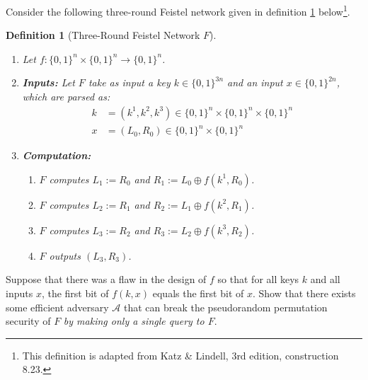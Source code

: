 \documentclass[11pt]{article}
\newcommand{\A}{\mathcal{A}}
\newtheorem{definition}[theorem]{Definition}
\numberwithin{equation}{section}
\begin{document}
Consider the following three-round Feistel network given in definition \ref{def:feistel_network} below\footnote{This definition is adapted from Katz \& Lindell, 3rd edition, construction 8.23.}.
\begin{definition}[Three-Round Feistel Network $F$]\label{def:feistel_network}
$ $
\begin{enumerate}
    \item Let $f: \{0,1\}^n \times \{0,1\}^{n}\to \{0,1\}^n$.
    \item \textbf{Inputs:} Let $F$ take as input a key $k \in \{0,1\}^{3n}$ and an input $x \in \{0,1\}^{2n}$, which are parsed as:
    \begin{align*}
        k &= (k^1, k^2, k^3) \in \{0,1\}^n \times \{0,1\}^n \times \{0,1\}^n\\
        x &= (L_0, R_0) \in \{0,1\}^{n} \times \{0,1\}^n
    \end{align*}
    \item \textbf{Computation:}
    \begin{enumerate}
        \item $F$ computes $L_1 := R_0$ and $R_1 := L_0 \oplus f(k^1, R_0)$.
        \item $F$ computes $L_2 := R_1$ and $R_2 := L_1 \oplus f(k^2, R_1)$.
        \item $F$ computes $L_3 := R_2$ and $R_3 := L_2 \oplus f(k^3, R_2)$.
        \item $F$ outputs $(L_3, R_3)$.
    \end{enumerate}
\end{enumerate}
\end{definition}

Suppose that there was a flaw in the design of $f$ so that for all keys $k$ and all inputs $x$, the first bit of $f(k, x)$ equals the first bit of $x$. Show that there exists some efficient adversary $\A$ that can break the pseudorandom permutation security of $F$ \textit{by making only a single query to $F$}.\newline
\end{document}
